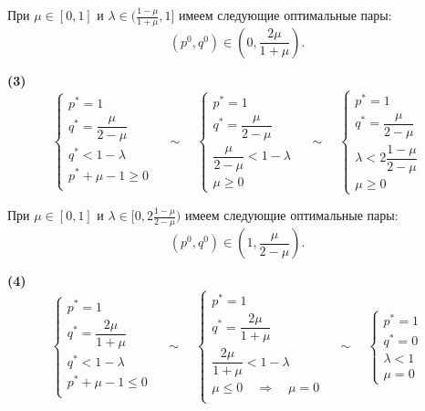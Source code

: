 При $\mu \in [0, 1]$ и $\lambda \in (\frac{1-\mu}{1+\mu}, 1]$
имеем следующие оптимальные пары:
$$
	(p^0, q^0) \in (0, \dfrac{2\mu}{1 + \mu}).
$$

\textbf{(3)}
$$
	\begin{cases}
		p^* = 1 \\
		q^* = \dfrac{\mu}{2-\mu} \\
		q^* < 1 - \lambda \\
		p^* + \mu - 1 \geqslant 0 \\
	\end{cases}
	\quad \sim \quad
	\begin{cases}
		p^* = 1 \\
		q^* = \dfrac{\mu}{2-\mu} \\
		\dfrac{\mu}{2-\mu} < 1 - \lambda \\
		\mu \geqslant 0
	\end{cases}
	\quad \sim \quad
	\begin{cases}
		p^* = 1 \\
		q^* = \dfrac{\mu}{2-\mu} \\
		\lambda < 2\dfrac{1-\mu}{2-\mu} \\
		\mu \geqslant 0
	\end{cases}
$$

При $\mu \in [0, 1]$ и $\lambda \in [0, 2\frac{1-\mu}{2-\mu})$
имеем следующие оптимальные пары:
$$
	(p^0, q^0) \in (1, \frac{\mu}{2 - \mu}).
$$

\textbf{(4)}
$$
	\begin{cases}
		p^* = 1 \\
		q^* = \dfrac{2\mu}{1+\mu} \\
		q^* < 1 - \lambda \\
		p^* + \mu - 1 \leqslant 0 \\
	\end{cases}
	\quad \sim \quad
	\begin{cases}
		p^* = 1 \\
		q^* = \dfrac{2\mu}{1+\mu} \\
		\dfrac{2\mu}{1+\mu} < 1 - \lambda \\
		\mu \leqslant 0 \quad \Rightarrow \quad \mu = 0 \\
	\end{cases}
	\quad \sim \quad
	\begin{cases}
		p^* = 1 \\
		q^* = 0 \\
		\lambda < 1 \\
		\mu = 0
	\end{cases}
$$

